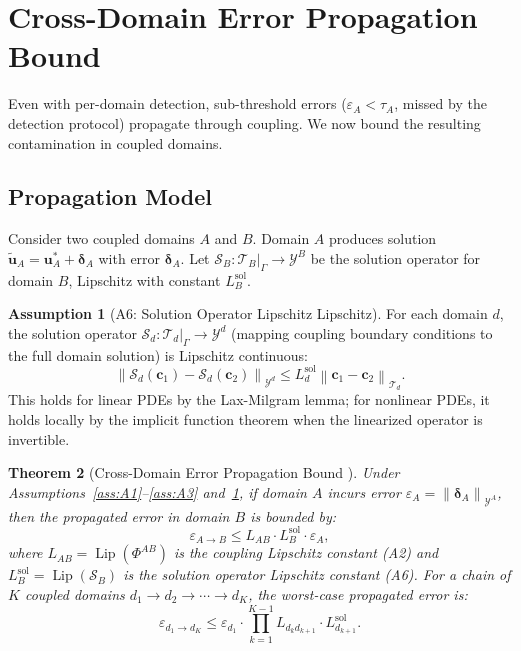 \documentclass[11pt,a4paper]{article}
\newtheorem{theorem}{Theorem}[section]
\theoremstyle{definition}
\newtheorem{assumption}[theorem]{Assumption}
\DeclareMathOperator{\Lip}{Lip}
\newcommand{\norm}[1]{\left\lVert#1\right\rVert}
\newcommand{\interface}{\Gamma}
\begin{document}
\section{Cross-Domain Error Propagation Bound }
\label{sec:cross_domain}

Even with per-domain detection, sub-threshold errors ($\varepsilon_A < \tau_A$, missed by the detection protocol) propagate through coupling. We now bound the resulting contamination in coupled domains.

\subsection{Propagation Model}

Consider two coupled domains $A$ and $B$. Domain $A$ produces solution $\tilde{\mathbf{u}}_A = \mathbf{u}_A^* + \boldsymbol{\delta}_A$ with error $\boldsymbol{\delta}_A$. Let $\mathcal{S}_B: \mathcal{T}_B|_\interface \to \mathcal{Y}^B$ be the solution operator for domain $B$, Lipschitz with constant $L_B^{\mathrm{sol}}$.

\begin{assumption}[A6: Solution Operator Lipschitz Lipschitz]\label{ass:A6}
For each domain $d$, the solution operator $\mathcal{S}_d: \mathcal{T}_d|_\interface \to \mathcal{Y}^d$ (mapping coupling boundary conditions to the full domain solution) is Lipschitz continuous:
\begin{equation}
\norm{\mathcal{S}_d(\mathbf{c}_1) - \mathcal{S}_d(\mathbf{c}_2)}_{\mathcal{Y}^d} \leq L_d^{\mathrm{sol}} \norm{\mathbf{c}_1 - \mathbf{c}_2}_{\mathcal{T}_d}.
\end{equation}
This holds for linear PDEs by the Lax-Milgram lemma; for nonlinear PDEs, it holds locally by the implicit function theorem when the linearized operator is invertible.
\end{assumption}

\begin{theorem}[Cross-Domain Error Propagation Bound ]\label{thm:cross_domain}
Under Assumptions~\ref{ass:A1}--\ref{ass:A3} and~\ref{ass:A6}, if domain $A$ incurs error $\varepsilon_A = \norm{\boldsymbol{\delta}_A}_{\mathcal{Y}^A}$, then the propagated error in domain $B$ is bounded by:
\begin{equation}\label{eq:cross_bound}
\varepsilon_{A \to B} \leq L_{AB} \cdot L_B^{\mathrm{sol}} \cdot \varepsilon_A,
\end{equation}
where $L_{AB} = \Lip(\Phi^{AB})$ is the coupling Lipschitz constant (A2) and $L_B^{\mathrm{sol}} = \Lip(\mathcal{S}_B)$ is the solution operator Lipschitz constant (A6). For a chain of $K$ coupled domains $d_1 \to d_2 \to \cdots \to d_K$, the worst-case propagated error is:
\begin{equation}\label{eq:chain_bound}
\varepsilon_{d_1 \to d_K} \leq \varepsilon_{d_1} \cdot \prod_{k=1}^{K-1} L_{d_k d_{k+1}} \cdot L_{d_{k+1}}^{\mathrm{sol}}.
\end{equation}
\end{theorem}
\end{document}
